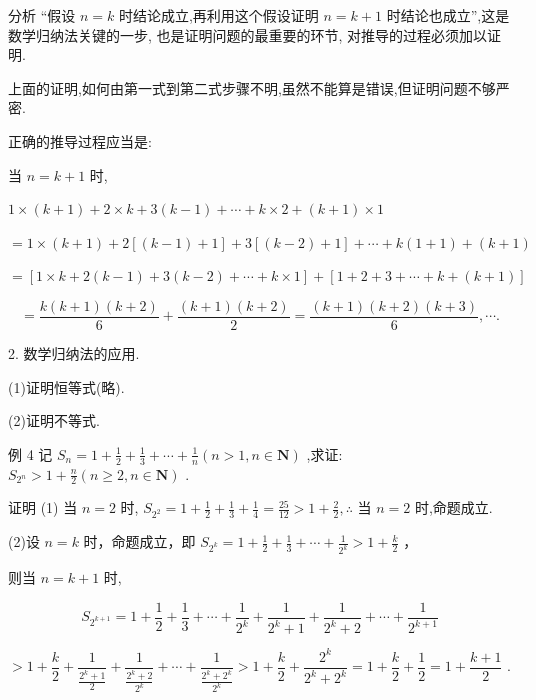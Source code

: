 \documentclass[10pt]{article}
\begin{document}
分析 “假设 \(n = k\) 时结论成立,再利用这个假设证明 \(n = k + 1\) 时结论也成立”,这是数学归纳法关键的一步, 也是证明问题的最重要的环节, 对推导的过程必须加以证明.

上面的证明,如何由第一式到第二式步骤不明,虽然不能算是错误,但证明问题不够严密.

正确的推导过程应当是:

当 \(n = k + 1\) 时,

\(1 \times  \left( {k + 1}\right)  + 2 \times  k + 3\left( {k - 1}\right)  + \cdots  + k \times  2 + \left( {k + 1}\right)  \times  1\)

\(= 1 \times  \left( {k + 1}\right)  + 2\left\lbrack  {\left( {k - 1}\right)  + 1}\right\rbrack   + 3\left\lbrack  {\left( {k - 2}\right)  + 1}\right\rbrack   + \cdots  + k\left( {1 + 1}\right)  + \left( {k + 1}\right)\)

\(= \left\lbrack  {1 \times  k + 2\left( {k - 1}\right)  + 3\left( {k - 2}\right)  + \cdots  + k \times  1}\right\rbrack   + \left\lbrack  {1 + 2 + 3 + \cdots  + k + \left( {k + 1}\right) }\right\rbrack\)

\[
= \frac{k\left( {k + 1}\right) \left( {k + 2}\right) }{6} + \frac{\left( {k + 1}\right) \left( {k + 2}\right) }{2} = \frac{\left( {k + 1}\right) \left( {k + 2}\right) \left( {k + 3}\right) }{6},\cdots .
\]

2. 数学归纳法的应用.

(1)证明恒等式(略).

(2)证明不等式.

例 4 记 \({S}_{n} = 1 + \frac{1}{2} + \frac{1}{3} + \cdots  + \frac{1}{n}\left( {n > 1,n \in  \mathbf{N}}\right)\) ,求证: \({S}_{{2}^{n}} > 1 + \frac{n}{2}\left( {n \geq  2,n \in  \mathbf{N}}\right)\) .

证明 (1) 当 \(n = 2\) 时, \({S}_{{2}^{2}} = 1 + \frac{1}{2} + \frac{1}{3} + \frac{1}{4} = \frac{25}{12} > 1 + \frac{2}{2},\therefore\) 当 \(n = 2\) 时,命题成立.

(2)设 \(n = k\) 时，命题成立，即 \({S}_{{2}^{k}} = 1 + \frac{1}{2} + \frac{1}{3} + \cdots  + \frac{1}{{2}^{k}} > 1 + \frac{k}{2}\) ，

则当 \(n = k + 1\) 时,

\[
{S}_{{2}^{k + 1}} = 1 + \frac{1}{2} + \frac{1}{3} + \cdots  + \frac{1}{{2}^{k}} + \frac{1}{{2}^{k} + 1} + \frac{1}{{2}^{k} + 2} + \cdots  + \frac{1}{{2}^{k + 1}}
\]

\[
> 1 + \frac{k}{2} + \frac{1}{\frac{{2}^{k} + 1}{2}} + \frac{1}{\frac{{2}^{k} + 2}{{2}^{k}}} + \cdots  + \frac{1}{\frac{{2}^{k} + {2}^{k}}{{2}^{k}}} > 1 + \frac{k}{2} + \frac{{2}^{k}}{{2}^{k} + {2}^{k}} = 1 + \frac{k}{2} + \frac{1}{2} = 1 + \frac{k + 1}{2}\text{ . }
\]
\end{document}
